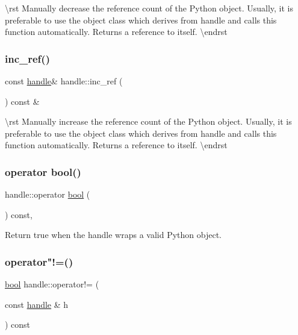 \textbackslash{}rst Manually decrease the reference count of the Python object. Usually, it is preferable to use the {\ttfamily object} class which derives from {\ttfamily handle} and calls this function automatically. Returns a reference to itself. \textbackslash{}endrst \mbox{\label{classhandle_ab9c5f2cbecb0b37f53765b1c501b7451}} 
\subsubsection{\texorpdfstring{inc\_ref()}{inc\_ref()}}
{\footnotesize\ttfamily const \mbox{\hyperlink{classhandle}{handle}}\& handle\+::inc\+\_\+ref (\begin{DoxyParamCaption}{ }\end{DoxyParamCaption}) const \&\hspace{0.3cm}{\ttfamily [inline]}}

\textbackslash{}rst Manually increase the reference count of the Python object. Usually, it is preferable to use the {\ttfamily object} class which derives from {\ttfamily handle} and calls this function automatically. Returns a reference to itself. \textbackslash{}endrst \mbox{\label{classhandle_a2c60694c460b2227f2a00c7b873d7436}} 
\subsubsection{\texorpdfstring{operator bool()}{operator bool()}}
{\footnotesize\ttfamily handle\+::operator \mbox{\hyperlink{asdl_8h_af6a258d8f3ee5206d682d799316314b1}{bool}} (\begin{DoxyParamCaption}{ }\end{DoxyParamCaption}) const\hspace{0.3cm}{\ttfamily [inline]}, {\ttfamily [explicit]}}



Return {\ttfamily true} when the {\ttfamily handle} wraps a valid Python object. 

\mbox{\label{classhandle_a71ecf002785a489fbe1db0aa6fb05bc5}} 
\subsubsection{\texorpdfstring{operator"!=()}{operator!=()}}
{\footnotesize\ttfamily \mbox{\hyperlink{asdl_8h_af6a258d8f3ee5206d682d799316314b1}{bool}} handle\+::operator!= (\begin{DoxyParamCaption}\item[{const \mbox{\hyperlink{classhandle}{handle}} \&}]{h }\end{DoxyParamCaption}) const\hspace{0.3cm}{\ttfamily [inline]}}

